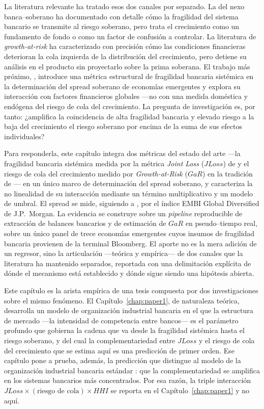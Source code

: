 La literatura relevante ha tratado esos dos canales por separado. La del nexo banca--soberano ha documentado con detalle cómo la fragilidad del sistema bancario se transmite al riesgo soberano, pero trata el crecimiento como un fundamento de fondo o como un factor de confusión a controlar. La literatura de \textit{growth-at-risk} ha caracterizado con precisión cómo las condiciones financieras deterioran la cola izquierda de la distribución del crecimiento, pero detiene su análisis en el producto sin proyectarlo sobre la prima soberana. El trabajo más próximo, \citet{Chari2024b}, introduce una métrica estructural de fragilidad bancaria sistémica en la determinación del spread soberano de economías emergentes y explora su interacción con factores financieros globales —no con una medida doméstica y endógena del riesgo de cola del crecimiento. La pregunta de investigación es, por tanto: ¿amplifica la coincidencia de alta fragilidad bancaria y elevado riesgo a la baja del crecimiento el riesgo soberano por encima de la suma de sus efectos individuales?

Para responderla, este capítulo integra dos métricas del estado del arte —la fragilidad bancaria sistémica medida por la métrica \textit{Joint Loss} ($JLoss$) de \citet{Chari2024b} y el riesgo de cola del crecimiento medido por \textit{Growth-at-Risk} ($GaR$) en la tradición de \citet{ABG2019b}— en un único marco de determinación del spread soberano, y caracteriza la no linealidad de su interacción mediante un término multiplicativo y un modelo de umbral. El spread se mide, siguiendo a \citet{Chari2024b}, por el índice EMBI Global Diversified de J.P.\ Morgan. La evidencia se construye sobre un \textit{pipeline} reproducible de extracción de balances bancarios y de estimación de $GaR$ en pseudo--tiempo real, sobre un único panel de trece economías emergentes cuyos insumos de fragilidad bancaria provienen de la terminal Bloomberg. El aporte no es la mera adición de un regresor, sino la articulación —teórica y empírica— de dos canales que la literatura ha mantenido separados, reportada con una delimitación explícita de dónde el mecanismo está establecido y dónde sigue siendo una hipótesis abierta.

Este capítulo es la arista empírica de una tesis compuesta por dos investigaciones sobre el mismo fenómeno. El Capítulo~\ref{chap:paper1}, de naturaleza teórica, desarrolla un modelo de organización industrial bancaria en el que la estructura de mercado —la intensidad de competencia entre bancos— es el parámetro profundo que gobierna la cadena que va desde la fragilidad sistémica hasta el riesgo soberano, y del cual la complementariedad entre $JLoss$ y el riesgo de cola del crecimiento que se estima aquí es una predicción de primer orden. Ese capítulo pone a prueba, además, la predicción que distingue al modelo de la organización industrial bancaria estándar \citep{MMR2010b}: que la complementariedad se amplifica en los sistemas bancarios más concentrados. Por esa razón, la triple interacción $JLoss\times(\text{riesgo de cola})\times HHI$ se reporta en el Capítulo~\ref{chap:paper1} y no aquí.

